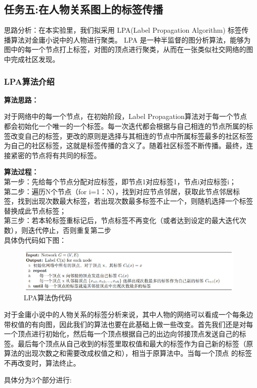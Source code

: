 \documentclass[a4paper,UTF8]{article}
\numberwithin{equation}{section}
\begin{document}
\subsection{任务五:在人物关系图上的标签传播}
思路分析：在本实验里，我们拟采用 LPA(Label Propagation Algorithm) 标签传播算法对金庸小说中的人物进行聚类。 LPA 是一种半监督的图分析算法，能够为图中的每一个节点打上标签，对图的顶点进行聚类，从而在一张类似社交网络的图中完成社区发现。
\subsubsection{LPA算法介绍}
\textbf{算法思路：}\par
对于网络中的每一个节点，在初始阶段，Label Propagation算法对于每一个节点都会初始化一个唯一的一个标签。每一次迭代都会根据与自己相连的节点所属的标签改变自己的标签，更改的原则是选择与其相连的节点中所属标签最多的社区标签为自己的社区标签，这就是标签传播的含义了。随着社区标签不断传播。最终，连接紧密的节点将有共同的标签。\par
\textbf{算法过程：}\\
第一步：先给每个节点分配对应标签，即节点1对应标签1，节点i对应标签i；\\
第二步：遍历N个节点（for i=1：N），找到对应节点邻居，获取此节点邻居标签，找到出现次数最大标签，若出现次数最多标签不止一个，则随机选择一个标签替换成此节点标签；\\
第三步：若本轮标签重标记后，节点标签不再变化（或者达到设定的最大迭代次数），则迭代停止，否则重复第二步\\
具体伪代码如下图：
\begin{figure}[H]
    \centering

    \includegraphics[width = 15cm]{LPAcode.jpg}

    \caption{LPA算法伪代码}
\end{figure}
对于金庸小说中的人物关系的标签分析来说，其中人物的网络可以看成一个每条边带权值的有向图，因此我们的算法也要在此基础上做一些改变。首先我们还是对每一个顶点进行初始化，然后每一个顶点根据自己的出边向邻接顶点发送自己的标签。最后每个顶点从自己收到的标签里取权值和最大的标签作为自己新的标签（原算法的出现次数之和需要改成权值之和），相当于原算法中。当每一个顶点 的标签不再改变时，算法终止。\par
具体分为3个部分进行:
\end{document}

